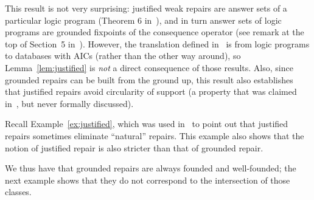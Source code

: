 This result is not very surprising: justified weak repairs are answer sets of a particular logic program (Theorem 6 in~\cite{Caroprese2011}), and in turn answer sets of logic programs are grounded fixpoints of the consequence operator (see remark at the top of Section~5 in~).
However, the translation defined in~\cite{Caroprese2011} is from logic programs to databases with AICs (rather than the other way around), so Lemma~\ref{lem:justified} is \emph{not} a direct consequence of those results.
Also, since grounded repairs can be built from the ground up, this result also establishes that justified repairs avoid circularity of support (a property that was claimed in~\cite{Caroprese2011}, but never formally discussed).

Recall Example~\ref{ex:justified}, which was used in~\cite{CEGN13} to point out that justified repairs sometimes eliminate ``natural'' repairs.
This example also shows that the notion of justified repair is also stricter than that of grounded repair.

We thus have that grounded repairs are always founded and well-founded; the next example shows that they do not correspond to the intersection of those classes.

